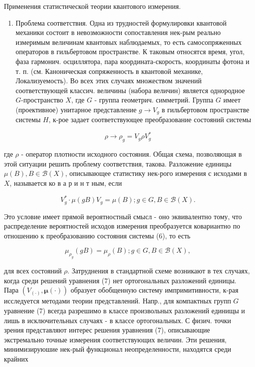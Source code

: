 \documentclass[10pt]{article}
\begin{document}
Применения статистической теории квантового измерения.



\begin{enumerate}

  \item Проблема соответствия. Одна из трудностей формулировки квантовой механики состоит в невозможности сопоставления нек-рым реально измеримым величинам квантовых наблюдаемых, то есть самосопряженных операторов в гильбертовом пространстве. К таковым относятся время, угол, фаза гармонич. осциллятора, пара координата-скорость, координаты фотона и т. п. (см. Каноническая сопряженность в квантовой механике, Локализуемость). Во всех этих случаях множеством значений соответствующей классич. величины (набора величин) является однородное $G$-пространство $X$, где $G$ - группа геометрич. симметрий. Группа $G$ имеет (проективное) унитарное представление $g \rightarrow V_{g}$ в гильбертовом пространстве системы $H$, к-рое задает соответствующее преобразование состояний системы

\end{enumerate}



\[

\rho \rightarrow \rho_{g}=V_{g} \rho V_{g}^{*}

\]



где $\rho$ - оператор плотности исходного состояния. Общая схема, позволяющая в этой ситуации решить проблему соответствия, такова. Разложение единицы $\mu(B), B \in \mathscr{B}(X)$, описывающее статистику нек-рого измерения с исходами в $X$, называется ко в а р и н т ным, если



\[

V_{g}^{*} \cdot \mu(g B) V_{g}=\mu(B) ; g \in G, B \in \mathscr{B}(X) .

\]



Это условие имеет прямой вероятностный смысл - оно эквивалентно тому, что распределение вероятностей исходов измерения преобразуется ковариантно по отношению к преобразованию состояния системы (6), то есть



\[

\mu_{\rho_{g}}(g B)=\mu_{\rho}(B) ; g \in G, B \in \mathscr{B}(X),

\]



для всех состояний $\rho$. Затруднения в стандартной схеме возникают в тех случаях, когда среди решений уравнения (7) нет ортогональных разложений единицы. Пара $\left(V_{(\cdot)}, \boldsymbol{\mu}(\cdot)\right)$ образует обобщенную систему импримитивности, к-рая исследуется методами теории представлений. Напр., для компактных групп $G$ уравнение (7) всегда разрешимо в классе произвольных разложений единищы и лишь в исключительных случаях - в классе ортогональных. С физич. точки зрения представляют интерес решения уравнения (7), описывающие экстремально точные измерения соответствующих величин. Эти решения, минимизируюшие нек-рый функционал неопределенности, находятся среди крайних
\end{document}
